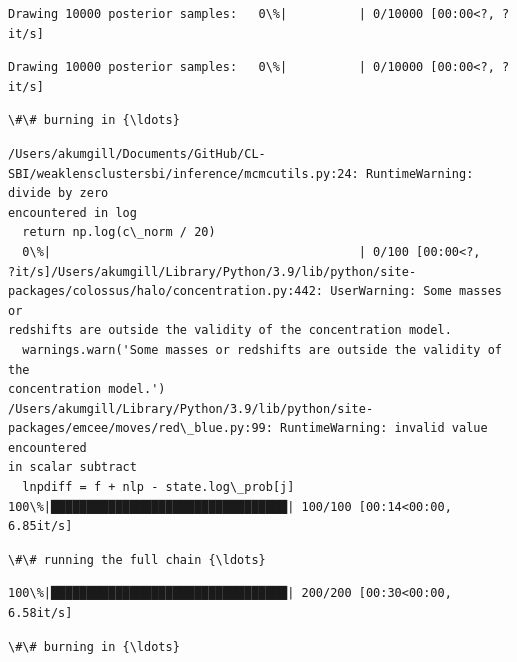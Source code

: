 \documentclass[11pt]{article}
\begin{document}
    
    
    \begin{Verbatim}[commandchars=\\\{\}]
Drawing 10000 posterior samples:   0\%|          | 0/10000 [00:00<?, ?it/s]
    \end{Verbatim}

    
    
    \begin{Verbatim}[commandchars=\\\{\}]
Drawing 10000 posterior samples:   0\%|          | 0/10000 [00:00<?, ?it/s]
    \end{Verbatim}

    
    \begin{Verbatim}[commandchars=\\\{\}]
\#\# burning in {\ldots}
    \end{Verbatim}

    \begin{Verbatim}[commandchars=\\\{\}]
/Users/akumgill/Documents/GitHub/CL-
SBI/weaklensclustersbi/inference/mcmcutils.py:24: RuntimeWarning: divide by zero
encountered in log
  return np.log(c\_norm / 20)
  0\%|                                           | 0/100 [00:00<?,
?it/s]/Users/akumgill/Library/Python/3.9/lib/python/site-
packages/colossus/halo/concentration.py:442: UserWarning: Some masses or
redshifts are outside the validity of the concentration model.
  warnings.warn('Some masses or redshifts are outside the validity of the
concentration model.')
/Users/akumgill/Library/Python/3.9/lib/python/site-
packages/emcee/moves/red\_blue.py:99: RuntimeWarning: invalid value encountered
in scalar subtract
  lnpdiff = f + nlp - state.log\_prob[j]
100\%|█████████████████████████████████| 100/100 [00:14<00:00,  6.85it/s]
    \end{Verbatim}

    \begin{Verbatim}[commandchars=\\\{\}]
\#\# running the full chain {\ldots}
    \end{Verbatim}

    \begin{Verbatim}[commandchars=\\\{\}]
100\%|█████████████████████████████████| 200/200 [00:30<00:00,  6.58it/s]
    \end{Verbatim}

    \begin{Verbatim}[commandchars=\\\{\}]
\#\# burning in {\ldots}
    \end{Verbatim}
\end{document}

